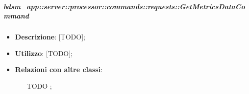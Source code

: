         \subparagraph{bdsm\_app::server::processor::commands::requests::GetMetricsDataCommand} %
        \label{subp:bdsm_app_server_processor_commands_requests_getmetricsdatacommand}
        \begin{itemize}
          \item \textbf{Descrizione}: [TODO];
          \item \textbf{Utilizzo}: [TODO];
          \item \textbf{Relazioni con altre classi}:
            \begin{itemize}
              \item [TODO];
            \end{itemize}
        \end{itemize}
